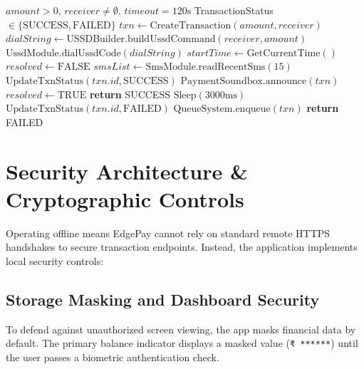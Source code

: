 \documentclass[10pt,journal,compsoc]{IEEEtran}
\begin{document}
\begin{algorithmic}[1]
\REQUIRE $amount > 0$, $receiver \neq \emptyset$, $timeout = 120\text{s}$
\ENSURE TransactionStatus $\in \{\text{SUCCESS}, \text{FAILED}\}$
\STATE $txn \leftarrow \text{CreateTransaction}(amount, receiver)$
\STATE $dialString \leftarrow \text{USSDBuilder.buildUssdCommand}(receiver, amount)$
\STATE $\text{UssdModule.dialUssdCode}(dialString)$
\STATE $startTime \leftarrow \text{GetCurrentTime}()$
\STATE $resolved \leftarrow \text{FALSE}$
    \STATE $smsList \leftarrow \text{SmsModule.readRecentSms}(15)$
                \STATE $\text{UpdateTxnStatus}(txn.id, \text{SUCCESS})$
                \STATE $\text{PaymentSoundbox.announce}(txn)$
                \STATE $resolved \leftarrow \text{TRUE}$
                \STATE \textbf{return} SUCCESS
            \ENDIF
        \ENDIF
    \ENDFOR
    \STATE $\text{Sleep}(3000\text{ms})$
\ENDWHILE
\STATE $\text{UpdateTxnStatus}(txn.id, \text{FAILED})$
\STATE $\text{QueueSystem.enqueue}(txn)$
\STATE \textbf{return} FAILED
\end{algorithmic}

\section{Security Architecture \& Cryptographic Controls}
Operating offline means EdgePay cannot rely on standard remote HTTPS handshakes to secure transaction endpoints. Instead, the application implements local security controls:

\subsection{Storage Masking and Dashboard Security}
To defend against unauthorized screen viewing, the app masks financial data by default. The primary balance indicator displays a masked value (\texttt{₹ ******}) until the user passes a biometric authentication check.
\end{document}
